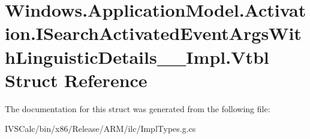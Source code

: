 \hypertarget{struct_windows_1_1_application_model_1_1_activation_1_1_i_search_activated_event_args_with_linguistic_details_____impl_1_1_vtbl}{}\section{Windows.\+Application\+Model.\+Activation.\+I\+Search\+Activated\+Event\+Args\+With\+Linguistic\+Details\+\_\+\+\_\+\+Impl.\+Vtbl Struct Reference}
\label{struct_windows_1_1_application_model_1_1_activation_1_1_i_search_activated_event_args_with_linguistic_details_____impl_1_1_vtbl}


The documentation for this struct was generated from the following file\+:\begin{DoxyCompactItemize}
\item 
I\+V\+S\+Calc/bin/x86/\+Release/\+A\+R\+M/ilc/Impl\+Types.\+g.\+cs\end{DoxyCompactItemize}
